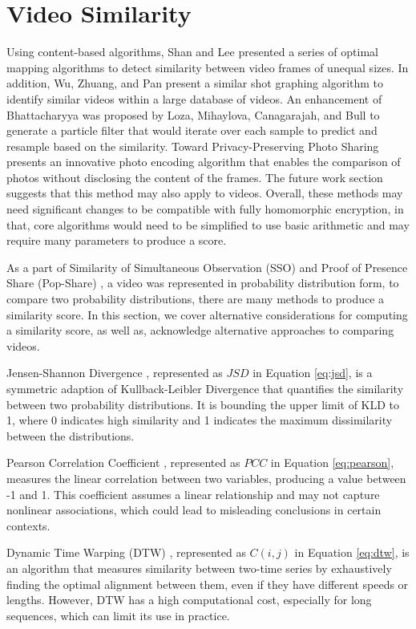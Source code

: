 \section{Video Similarity}
\label{sec:Related Video Similarity}
Using content-based algorithms, Shan and Lee \cite{Shan2002-sfs} presented a series of optimal mapping algorithms to detect similarity between video frames of unequal sizes. In addition, Wu, Zhuang, and Pan \cite{Wu2000-nf} present a similar shot graphing algorithm to identify similar videos within a large database of videos. An enhancement of Bhattacharyya was proposed by Loza, Mihaylova, Canagarajah, and Bull \cite{Loza2006-sso} to generate a particle filter that would iterate over each sample to predict and resample based on the similarity. Toward Privacy-Preserving Photo Sharing \cite{Ra2013-p3} presents an innovative photo encoding algorithm that enables the comparison of photos without disclosing the content of the frames. The future work section suggests that this method may also apply to videos. Overall, these methods may need significant changes to be compatible with fully homomorphic encryption, in that, core algorithms would need to be simplified to use basic arithmetic and may require many parameters to produce a score.

As a part of Similarity of Simultaneous Observation (SSO) \cite{Wu2019-SSO} and Proof of Presence Share (Pop-Share) \cite{Lagesse2021-PopShare}, a video was represented in probability distribution form, to compare two probability distributions, there are many methods to produce a similarity score. In this section, we cover alternative considerations for computing a similarity score, as well as, acknowledge alternative approaches to comparing videos.

Jensen-Shannon Divergence \cite{Lin1991-jsd}, represented as $JSD$ in Equation \ref{eq:jsd}, is a symmetric adaption of Kullback-Leibler Divergence that quantifies the similarity between two probability distributions. It is bounding the upper limit of KLD to 1, where 0 indicates high similarity and 1 indicates the maximum dissimilarity between the distributions.



Pearson Correlation Coefficient \cite{Pearson1896-hp}, represented as $PCC$ in Equation \ref{eq:pearson}, measures the linear correlation between two variables, producing a value between -1 and 1. This coefficient assumes a linear relationship and may not capture nonlinear associations, which could lead to misleading conclusions in certain contexts. 



Dynamic Time Warping (DTW) \cite{Sakoe1978-dtw}, represented as $C(i,j)$ in Equation \ref{eq:dtw}, is an algorithm that measures similarity between two-time series by exhaustively finding the optimal alignment between them, even if they have different speeds or lengths. However, DTW has a high computational cost, especially for long sequences, which can limit its use in practice. 


